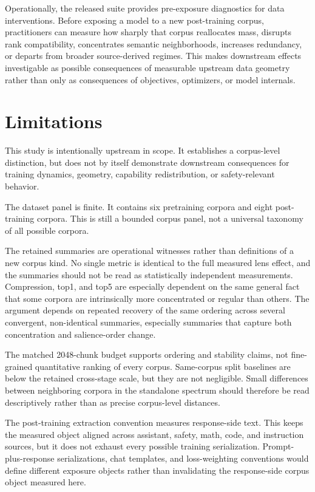 \documentclass[11pt]{article}
\begin{document}
Operationally, the released suite provides pre-exposure diagnostics for data interventions. Before exposing a model to a new post-training corpus, practitioners can measure how sharply that corpus reallocates mass, disrupts rank compatibility, concentrates semantic neighborhoods, increases redundancy, or departs from broader source-derived regimes. This makes downstream effects investigable as possible consequences of measurable upstream data geometry rather than only as consequences of objectives, optimizers, or model internals.

\section{Limitations}\label{limitations}

This study is intentionally upstream in scope. It establishes a corpus-level distinction, but does not by itself demonstrate downstream consequences for training dynamics, geometry, capability redistribution, or safety-relevant behavior.

The dataset panel is finite. It contains six pretraining corpora and eight post-training corpora. This is still a bounded corpus panel, not a universal taxonomy of all possible corpora.

The retained summaries are operational witnesses rather than definitions of a new corpus kind. No single metric is identical to the full measured lens effect, and the summaries should not be read as statistically independent measurements. Compression, top1, and top5 are especially dependent on the same general fact that some corpora are intrinsically more concentrated or regular than others. The argument depends on repeated recovery of the same ordering across several convergent, non-identical summaries, especially summaries that capture both concentration and salience-order change.

The matched 2048-chunk budget supports ordering and stability claims, not fine-grained quantitative ranking of every corpus. Same-corpus split baselines are below the retained cross-stage scale, but they are not negligible. Small differences between neighboring corpora in the standalone spectrum should therefore be read descriptively rather than as precise corpus-level distances.

The post-training extraction convention measures response-side text. This keeps the measured object aligned across assistant, safety, math, code, and instruction sources, but it does not exhaust every possible training serialization. Prompt-plus-response serializations, chat templates, and loss-weighting conventions would define different exposure objects rather than invalidating the response-side corpus object measured here.
\end{document}
